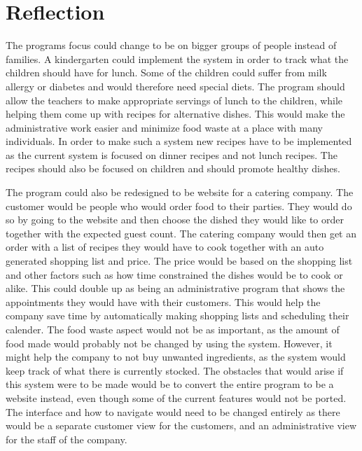 \section{Reflection}
The programs focus could change to be on bigger groups of people instead of families. A kindergarten could implement the system in order to track what the children should have for lunch. Some of the children could suffer from milk allergy or diabetes and would therefore need special diets. The program should allow the teachers to make appropriate servings of lunch to the children, while helping them come up with recipes for alternative dishes. This would make the administrative work easier and minimize food waste at a place with many individuals. In order to make such a system new recipes have to be implemented as the current system is focused on dinner recipes and not lunch recipes. The recipes should also be focused on children and should promote healthy dishes.

The program could also be redesigned to be website for a catering company. The customer would be people who would order food to their parties. They would do so by going to the website and then choose the dished they would like to order together with the expected guest count. The catering company would then get an order with a list of recipes they would have to cook together with an auto generated shopping list and price. The price would be based on the shopping list and other factors such as how time constrained the dishes would be to cook or alike. This could double up as being an administrative program that shows the appointments they would have with their customers. This would help the company save time by automatically making shopping lists and scheduling their calender. The food waste aspect would not be as important, as the amount of food made would probably not be changed by using the system. However, it might help the company to not buy unwanted ingredients, as the system would keep track of what there is currently stocked. The obstacles that would arise if this system were to be made would be to convert the entire program to be a website instead, even though some of the current features would not be ported. The interface and how to navigate would need to be changed entirely as there would be a separate customer view for the customers, and an administrative view for the staff of the company.